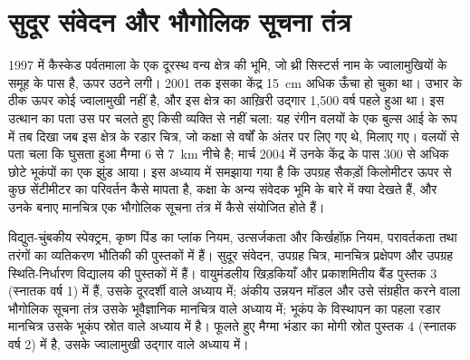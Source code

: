 \chapter{सुदूर संवेदन और भौगोलिक सूचना तंत्र}\label{ch:b3:remote-sensing-gis}

1997 में कैस्केड पर्वतमाला के एक दूरस्थ वन्य क्षेत्र की भूमि,
जो थ्री सिस्टर्स नाम के ज्वालामुखियों के समूह के पास है, ऊपर उठने लगी। 2001 तक इसका केंद्र
\qty{15}{cm} अधिक ऊँचा हो चुका था। उभार के ठीक ऊपर कोई ज्वालामुखी नहीं है, और
इस क्षेत्र का आख़िरी उद्गार 1,500 वर्ष पहले हुआ था। इस उत्थान का पता उस पर चलते हुए किसी व्यक्ति से नहीं चला:
यह रंगीन वलयों के एक बुल्स आई के रूप में तब दिखा जब
इस क्षेत्र के रडार चित्र, जो कक्षा से वर्षों के अंतर पर लिए गए थे, मिलाए गए।
वलयों से पता चला कि घुसता हुआ मैग्मा 6 से \qty{7}{km} नीचे है;
मार्च 2004 में उनके केंद्र के पास 300 से अधिक छोटे भूकंपों का एक झुंड आया।
इस अध्याय में समझाया गया है कि उपग्रह सैकड़ों किलोमीटर ऊपर से कुछ सेंटीमीटर का
परिवर्तन कैसे मापता है, कक्षा के अन्य संवेदक भूमि के बारे में क्या देखते हैं, और
उनके बनाए मानचित्र एक भौगोलिक सूचना तंत्र में कैसे
संयोजित होते हैं।

\begin{recall}
विद्युत-चुंबकीय स्पेक्ट्रम, कृष्ण पिंड का प्लांक नियम, उत्सर्जकता
और किर्खहॉफ़ नियम, परावर्तकता तथा तरंगों का व्यतिकरण भौतिकी की पुस्तकों में हैं।
सुदूर संवेदन, उपग्रह चित्र, मानचित्र प्रक्षेपण
और उपग्रह स्थिति-निर्धारण विद्यालय की पुस्तकों में हैं। वायुमंडलीय खिड़कियाँ और
प्रकाशमितीय बैंड पुस्तक 3 (स्नातक वर्ष 1) में हैं, उसके दूरदर्शी वाले अध्याय में;
अंकीय उन्नयन मॉडल और उसे संग्रहीत करने वाला भौगोलिक सूचना तंत्र उसके
भूवैज्ञानिक मानचित्र वाले अध्याय में; भूकंप के विस्थापन का पहला रडार मानचित्र
उसके भूकंप स्रोत वाले अध्याय में है। फूलते हुए मैग्मा भंडार का
मोगी स्रोत पुस्तक 4 (स्नातक वर्ष 2) में है,
उसके ज्वालामुखी उद्गार वाले अध्याय में।
\end{recall}

